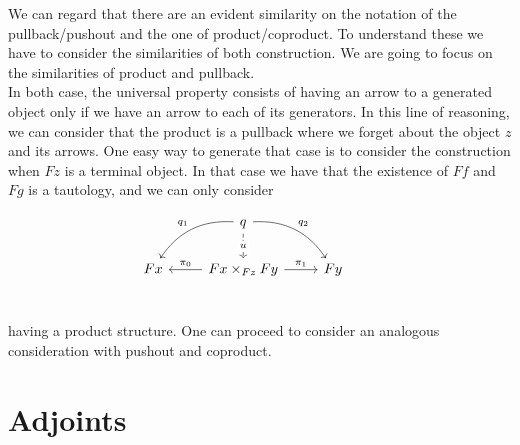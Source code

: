 We can regard that there are an evident similarity on the notation of the pullback/pushout and the one of product/coproduct. To understand these we have to consider the similarities of both construction. We are going to focus on the similarities of product and pullback.\\

In both case, the universal property consists of having an arrow to a generated object only if we have an arrow to each of its generators. In this line of reasoning, we can consider that the product is a pullback where we forget about the object $z$ and its arrows. One easy way to generate that case is to consider the construction when $Fz$ is a terminal object. In that case we have that the existence of $Ff$ and $Fg$ is a tautology, and we can only consider 

\[
\begin{tikzcd}
& q
\arrow[bend left]{dr}{q_2}
\arrow[bend right,swap]{dl}{q_1}
\arrow[dashed]{d}[description]{u} & & \\
 Fx  & Fx\times_{Fz}Fy \arrow{r}{\pi_1} \arrow{l}[swap]{\pi_0}& Fy \\
\end{tikzcd}
\]

having a product structure.  One can proceed to consider an analogous consideration with pushout and coproduct.\\







\section{Adjoints}

